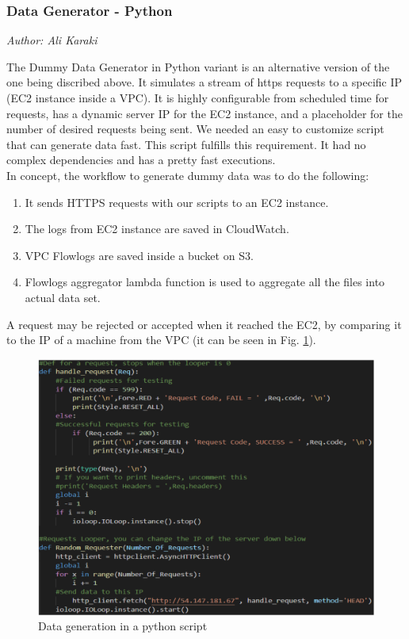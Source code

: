         \subsubsection{Data Generator - Python }\label{data-generator}
        
        \textit{Author: Ali Karaki}

        The Dummy Data Generator in Python variant is an alternative version of the one being discribed above. It simulates a stream of https requests to a specific IP (EC2 instance inside a VPC). It is highly configurable from scheduled time for requests, has a dynamic server IP for the EC2 instance, and a placeholder for the number of desired requests being sent. We needed an easy to customize script that can generate data fast. This script fulfills this requirement. It had no complex dependencies and has a pretty fast executions.\\ In concept, the workflow to generate dummy data was to do the following:
            \begin{enumerate}
                \item It sends HTTPS requests with our scripts to an EC2 instance.
                \item The logs from EC2 instance are saved in CloudWatch.
                \item VPC Flowlogs are saved inside a bucket on S3.
                \item Flowlogs aggregator lambda function is used to aggregate all the files into actual data set.
            \end{enumerate}
        A request may be rejected or accepted when it reached the EC2, by comparing it to the IP of a machine from the VPC (it can be seen in Fig. \ref{fig:data_gen}).
        \begin{figure}[h!]
            \centering
            \includegraphics[width=1\textwidth]{images/data-gen-2.png}
            \caption{Data generation in a python script}
            \label{fig:data_gen}
        \end{figure}\\
